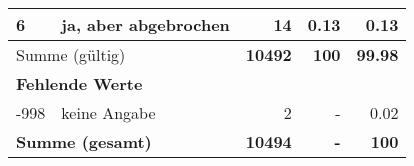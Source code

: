 \begin{longtable}{lXrrr}
     6 &
     \multicolumn{1}{X}{ ja, aber abgebrochen   } &


       \num{14} &
       \num[round-mode=places,round-precision=2]{0,13} &
         \num[round-mode=places,round-precision=2]{0,13} \\
     \midrule
     \multicolumn{2}{l}{Summe (gültig)} &
       \textbf{\num{10492}} &
     \textbf{100} &
       \textbf{\num[round-mode=places,round-precision=2]{99,98}} \\
     \multicolumn{5}{l}{\textbf{Fehlende Werte}}\\
       -998 &
       keine Angabe &
         \num{2} &
        - &
         \num[round-mode=places,round-precision=2]{0,02} \\
     \midrule
     \multicolumn{2}{l}{\textbf{Summe (gesamt)}} &
          \textbf{\num{10494}} &
        \textbf{-} &
        \textbf{100} \\
     \bottomrule
     \end{longtable}
     
